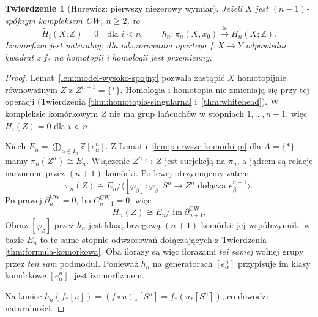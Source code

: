 \documentclass[11pt,a4paper,oneside]{report}
\newcommand{\Z}{\mathbb{Z}}
\theoremstyle{plain}
\newtheorem{twierdzenie}{Twierdzenie}[section]
\theoremstyle{definition}
\theoremstyle{remark}
\begin{document}
\begin{twierdzenie}[Hurewicz: pierwszy niezerowy wymiar]
\label{thm:hurewicz-wyzszy}
Jeżeli $X$ jest
$(n-1)$-spójnym
kompleksem CW,
$n\geq2$, to
\[
 \widetilde H_i(X;\Z)=0
 \quad\text{dla }i<n,
 \qquad
 h_n:\pi_n(X,x_0)
 \xrightarrow{\ \cong\ }H_n(X;\Z).
\]
Izomorfizm jest naturalny:
dla odwzorowania opartego
$f:X\to Y$ odpowiedni
kwadrat z $f_*$ na
homotopii i homologii
jest przemienny.
\end{twierdzenie}
\begin{proof}
Lemat~\ref{lem:model-wysoko-spojny}
pozwala zastąpić
$X$ homotopijnie
równoważnym $Z$
z $Z^{n-1}=\{*\}$.
Homologia i homotopia
nie zmieniają się
przy tej operacji
(Twierdzenia
\ref{thm:homotopia-singularna}
i~\ref{thm:whitehead}).
W kompleksie komórkowym
$Z$ nie ma grup
łańcuchów w
stopniach $1,\ldots,n-1$,
więc
$\widetilde H_i(Z)=0$
dla $i<n$.

Niech
$E_n=\bigoplus_{\alpha\in I_n}
\Z[e_\alpha^n]$.
Z Lematu~\ref{lem:pierwsze-komorki-pi}
dla $A=\{*\}$ mamy
$\pi_n(Z^n)\cong E_n$.
Włączenie
$Z^n\hookrightarrow Z$
jest surjekcją
na $\pi_n$,
a jądrem są relacje
narzucone przez
$(n+1)$-komórki.
Po lewej otrzymujemy
zatem
\[
 \pi_n(Z)
 \cong
 E_n/\langle
   [\varphi_\beta]:
   \varphi_\beta:S^n\to Z^n
   \text{ dołącza }e_\beta^{n+1}
 \rangle.
\]
Po prawej
$\partial_n^{\mathrm{CW}}=0$,
bo $C_{n-1}^{\mathrm{CW}}=0$,
więc
\[
 H_n(Z)
 \cong E_n/
     \operatorname{im}
       \partial_{n+1}^{\mathrm{CW}}.
\]
Obraz $[\varphi_\beta]$
przez $h_n$ jest
klasą brzegową
$(n+1)$-komórki:
jej współczynniki
w bazie $E_n$
to te same stopnie
odwzorowań dołączających
z Twierdzenia
\ref{thm:formula-komorkowa}.
Oba ilorazy są
więc ilorazami
\emph{tej samej}
wolnej grupy przez
\emph{ten sam}
podmoduł.
Ponieważ $h_n$
na generatorach
$[e_\alpha^n]$
przypisuje im
klasy komórkowe
$[e_\alpha^n]$,
jest izomorfizmem.

Na koniec
$h_n(f_*[u])
=(f\circ u)_*[S^n]
=f_*(u_*[S^n])$,
co dowodzi
naturalności.
\end{proof}
\end{document}
